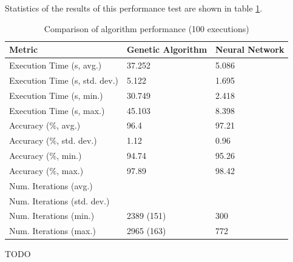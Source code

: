 \documentclass[a4paper]{article}
\begin{document}
Statistics of the results of this performance test are shown in table
\ref{tab:comparison_avg}.

\begin{table}[h!]
  \centering
  \begin{tabular}{@{}lll@{}}
    \toprule
    Metric                        & Genetic Algorithm & Neural Network \\
    \midrule
    Execution Time (s, avg.)      & 37.252            & 5.086          \\
    Execution Time (s, std. dev.) & 5.122             & 1.695          \\
    Execution Time (s, min.)      & 30.749            & 2.418          \\
    Execution Time (s, max.)      & 45.103            & 8.398          \\
    Accuracy (\%, avg.)           & 96.4              & 97.21          \\
    Accuracy (\%, std. dev.)      & 1.12              & 0.96           \\
    Accuracy (\%, min.)           & 94.74             & 95.26          \\
    Accuracy (\%, max.)           & 97.89             & 98.42          \\
    Num. Iterations (avg.)        &                   &                \\
    Num. Iterations (std. dev.)   &                   &                \\
    Num. Iterations (min.)        & 2389 (151)        & 300            \\
    Num. Iterations (max.)        & 2965 (163)        & 772            \\
    \bottomrule
  \end{tabular}
  \caption{Comparison of algorithm performance (100 executions)}
  \label{tab:comparison_avg}
\end{table}

TODO

\printbibliography
\end{document}
